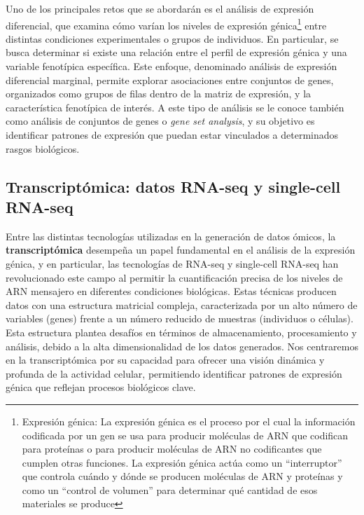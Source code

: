 Uno de los principales retos que se abordarán es el análisis de expresión diferencial, 
que examina cómo varían los niveles de expresión génica\footnote[5]{Expresión génica: La expresión génica es el proceso por el cual la información codificada por un gen se usa 
para producir moléculas de ARN que codifican para proteínas o para producir moléculas de ARN no codificantes que cumplen otras funciones. La expresión génica
actúa como un “interruptor” que controla cuándo y dónde se producen moléculas de ARN y proteínas y como un “control de volumen” para determinar qué cantidad
de esos materiales se produce} entre distintas condiciones experimentales o grupos de individuos. En particular, se
busca determinar si existe una relación entre el perfil de expresión génica y una variable fenotípica específica. Este enfoque, denominado análisis
de expresión diferencial marginal, permite explorar asociaciones entre conjuntos de genes, organizados como grupos de filas dentro de la matriz de expresión, 
y la característica fenotípica de interés. A este tipo de análisis se le conoce también como análisis de conjuntos de genes o \textit{gene set analysis}, y 
su objetivo es identificar patrones de expresión que puedan estar vinculados a determinados rasgos biológicos.



\subsection{Transcriptómica: datos RNA-seq y single-cell RNA-seq}

Entre las distintas tecnologías utilizadas en la generación de datos ómicos, la \textbf{transcriptómica} desempeña un papel fundamental en el análisis de la expresión génica, y en particular, las 
tecnologías de RNA-seq y single-cell RNA-seq han revolucionado este campo al permitir la cuantificación precisa de los 
niveles de ARN mensajero en diferentes condiciones biológicas. Estas técnicas producen datos con una estructura matricial 
compleja, caracterizada por un alto número de variables (genes) frente a un número reducido de muestras (individuos o células). 
Esta estructura plantea desafíos en términos de almacenamiento, procesamiento y análisis, debido a la alta dimensionalidad de 
los datos generados. Nos centraremos en la transcriptómica por su capacidad para ofrecer una visión dinámica 
y profunda de la actividad celular, permitiendo identificar patrones de expresión génica que reflejan procesos biológicos clave. \newline

